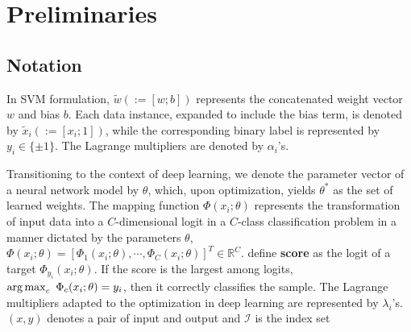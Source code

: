 \section{Preliminaries}\label{sec:prelim}




\subsection{Notation} \label{sec:notation}

In  SVM formulation, \( \tilde{w} (:= [w;b])\) represents the concatenated weight vector $w$ and bias $b$. %
Each data instance, expanded to include the bias term, is denoted by \( \tilde{x}_i (:= [x_i;1])\), while the corresponding binary label is represented by \( y_i \in \{\pm1\}\). The Lagrange multipliers are denoted by \( \alpha_i \)'s. 

Transitioning to the context of deep learning, we denote the parameter vector of a neural network model by \( \theta \), which, upon optimization, yields \( \theta^* \) as the set of learned weights. The mapping function \( \Phi(x_i; \theta) \) represents the transformation of input data into %
a $C$-dimensional logit in a $C$-class classification problem in a manner dictated by the parameters \( \theta \), \ie $\Phi(x_i; \theta) = [\Phi_1(x_i; \theta), \cdots, \Phi_C(x_i; \theta)]^T \in \mathbb{R}^C$. 
 define  \textbf{score} as the logit of a target  $\Phi_{y_i}(x_i; \theta)$. %
If the score is the largest among logits, \ie $\operatorname*{arg\,max}_c \ \Phi_{c}(x_i; \theta) = y_i$, then it correctly classifies the sample. 
The Lagrange multipliers adapted to the optimization in deep learning are represented by \( \lambda_i \)'s. $(x, y)$ denotes a pair of input and output and \( \mathcal{I} \) is the index set 




